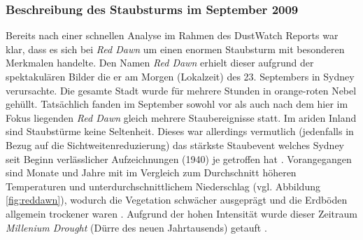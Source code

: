 \documentclass[12pt,a4paper,onecolumn]{scrartcl}
\begin{document}
\subsubsection{Beschreibung des Staubsturms im September 2009} \label{sec:reddawn}
Bereits nach einer schnellen Analyse im Rahmen des DustWatch Reports \citep{Leys.2009} war klar, dass es sich bei \textit{Red Dawn} um einen enormen Staubsturm mit besonderen Merkmalen handelte. Den Namen \textit{Red Dawn} erhielt dieser aufgrund der spektakulären Bilder die er am Morgen (Lokalzeit) des 23. Septembers in Sydney verursachte. Die gesamte Stadt wurde für mehrere Stunden in orange-roten Nebel gehüllt. Tatsächlich fanden im September sowohl vor als auch nach dem hier im Fokus liegenden \textit{Red Dawn} gleich mehrere Staubereignisse statt. Im ariden Inland sind Staubstürme keine Seltenheit. Dieses war allerdings vermutlich (jedenfalls in Bezug auf die Sichtweitenreduzierung) das stärkste Staubevent welches Sydney seit Beginn verlässlicher Aufzeichnungen (1940) je getroffen hat \citep{Leys.2011}. Vorangegangen sind Monate und Jahre mit im Vergleich zum Durchschnitt höheren Temperaturen und unterdurchschnittlichem Niederschlag (vgl. Abbildung \ref{fig:reddawn}), wodurch die Vegetation schwächer ausgeprägt und die Erdböden allgemein trockener waren \citep{Leys.2011}. Aufgrund der hohen Intensität wurde dieser Zeitraum \textit{Millenium Drought} (Dürre des neuen Jahrtausends) getauft \citep{Deckker.2014}.
\end{document}
